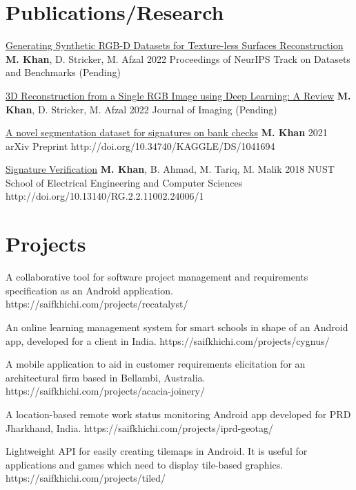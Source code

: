 \documentclass[%
              doublesided,
              paper=a4,
              fontsize=10pt
              ]{my-resume}
\begin{document}
{    

    \section{Publications/Research}
     \publication
    	{\href{https://projects.dfki.uni-kl.de/textureless_object_data/}{Generating Synthetic RGB-D Datasets for Texture-less Surfaces Reconstruction}} %
    	{\textbf{M. Khan}, D. Stricker, M. Afzal} %
    	{2022} %
    	{Proceedings of NeurIPS Track on Datasets and Benchmarks} %
    	{(Pending)} %

     \publication
    	{\href{https://saifkhichi.com/research/reconstruction-review/}{3D Reconstruction from a Single RGB Image using Deep Learning: A Review}} %
    	{\textbf{M. Khan}, D. Stricker, M. Afzal} %
    	{2022} %
    	{Journal of Imaging} %
    	{(Pending)} %

     \publication
    	{\href{https://saifkhichi.com/research/datasets/bcsd/}{A novel segmentation dataset for signatures on bank checks}} %
    	{\textbf{M. Khan}} %
    	{2021} %
    	{arXiv Preprint} %
    	{http://doi.org/10.34740/KAGGLE/DS/1041694} %

     \publication
    	{\href{https://saifkhichi.com/research/signature-verification/}{Signature Verification}} %
    	{\textbf{M. Khan}, B. Ahmad, M. Tariq, M. Malik} %
    	{2018} %
    	{NUST School of Electrical Engineering and Computer Sciences} %
    	{http://doi.org/10.13140/RG.2.2.11002.24006/1} %

    \section{Projects}
    {A collaborative tool for software project management and requirements specification as an Android application.}
    {https://saifkhichi.com/projects/recatalyst/}

    {An online learning management system for smart schools in shape of an Android app, developed for a client in India.}
    {https://saifkhichi.com/projects/cygnus/}

    {A mobile application to aid in customer requirements elicitation for an architectural firm based in Bellambi, Australia.}
    {https://saifkhichi.com/projects/acacia-joinery/}

    {A location-based remote work status monitoring Android app developed for PRD Jharkhand, India.}
    {https://saifkhichi.com/projects/iprd-geotag/}

    {Lightweight API for easily creating tilemaps in Android. It is useful for applications and games which need to display tile-based graphics.}
    {https://saifkhichi.com/projects/tiled/}
}
\makebody
\end{document}
